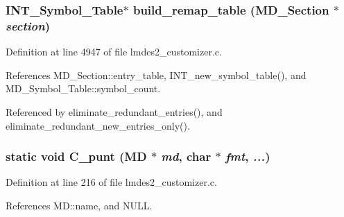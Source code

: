 \subsubsection{\setlength{\rightskip}{0pt plus 5cm}\bf{INT\_\-Symbol\_\-Table}$\ast$ build\_\-remap\_\-table (\bf{MD\_\-Section} $\ast$ {\em section})}\label{lmdes2__customizer_8c_7a6ced70906068dcb26b7acce31d0ca9}




Definition at line 4947 of file lmdes2\_\-customizer.c.

References MD\_\-Section::entry\_\-table, INT\_\-new\_\-symbol\_\-table(), and MD\_\-Symbol\_\-Table::symbol\_\-count.

Referenced by eliminate\_\-redundant\_\-entries(), and eliminate\_\-redundant\_\-new\_\-entries\_\-only().
\subsubsection{\setlength{\rightskip}{0pt plus 5cm}static void C\_\-punt (\bf{MD} $\ast$ {\em md}, char $\ast$ {\em fmt},  {\em ...})\hspace{0.3cm}{\tt  [static]}}\label{lmdes2__customizer_8c_6efdeefd9e046fe3a6d8369c3a48758b}




Definition at line 216 of file lmdes2\_\-customizer.c.

References MD::name, and NULL.

